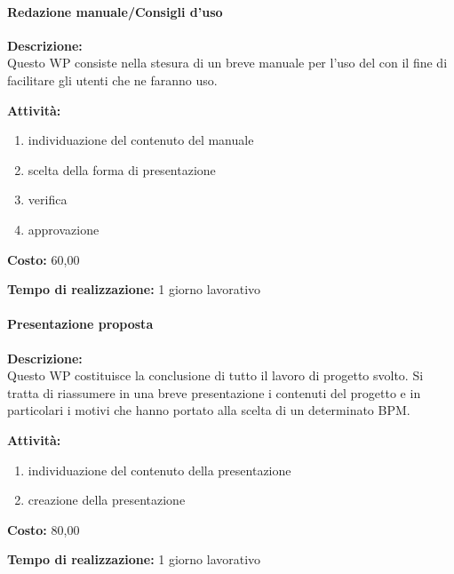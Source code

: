 \paragraph{\bfseries\sffamily{}Redazione manuale/Consigli d'uso}
\begin{description}
\item{\bfseries Descrizione:}\\
Questo WP consiste nella stesura di un breve manuale per l'uso del  con il fine di facilitare gli utenti che ne faranno uso.
\item{\bfseries Attività:}
\begin{enumerate}
	\item individuazione del contenuto del manuale
	\item scelta della forma di presentazione
	\item verifica 
 	\item approvazione	
\end{enumerate}
\item{\bfseries Costo:} \text{\euro} 60,00 
\item{\bfseries Tempo di realizzazione:}  1 giorno lavorativo
\end{description}

\paragraph{\bfseries\sffamily{}Presentazione proposta}
\begin{description}
\item{\bfseries Descrizione:}\\
Questo WP costituisce la conclusione di tutto il lavoro di progetto svolto. Si tratta di 		riassumere in una breve presentazione i contenuti del progetto e in particolari i motivi che hanno portato alla scelta di un determinato  BPM.
\item{\bfseries Attività:}
\begin{enumerate}
	\item individuazione del contenuto della presentazione
	\item creazione della presentazione
\end{enumerate}
\item{\bfseries Costo:} \text{\euro} 80,00 
\item{\bfseries Tempo di realizzazione:}  1 giorno lavorativo
\end{description}


